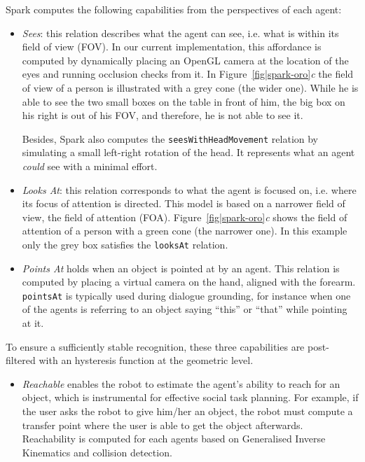 \documentclass[preprint,3p,times]{elsarticle}
\newcommand{\concept}[1]{{\small \texttt{#1}}}
\newcommand{\ie}{i.e.\xspace}
\begin{document}
{\sc Spark} computes the following capabilities from the perspectives of each agent:

\begin{itemize}

\item \emph{Sees}: this relation describes what the agent can see, \ie what is
    within its field of view (FOV). In our current implementation, this
    affordance is computed by dynamically placing an OpenGL camera at the
    location of the eyes and running occlusion checks from it.  In
    Figure~\ref{fig|spark-oro}\emph{c} the field of view of a person is
    illustrated with a grey cone (the wider one). While he is able to see the two
    small boxes on the table in front of him, the big box on his right is out of
    his FOV, and therefore, he is not able to see it. 

    Besides, {\sc Spark} also computes the \concept{seesWithHeadMovement}
    relation by simulating a small left-right rotation of the head. It
    represents what an agent \emph{could} see with a minimal effort.
    

\item \emph{Looks At}: this relation corresponds to what the agent is focused
    on, \ie where its focus of attention is directed. This model is based on a
    narrower field of view, the field of attention (FOA).
    Figure~\ref{fig|spark-oro}\emph{c} shows the field of attention
    of a person with a green cone (the narrower one). In this example only the grey
    box satisfies the \concept{looksAt} relation.


\item \emph{Points At} holds when an object is pointed at by an agent.
    This relation is computed by placing a virtual camera on the hand, aligned
    with the forearm. \concept{pointsAt} is typically used during dialogue
    grounding, for instance when one of the agents is referring to an object
    saying ``this'' or ``that'' while pointing at it.
\end{itemize}

To ensure a sufficiently stable recognition, these three capabilities are post-filtered
with an hysteresis function at the geometric level.

\begin{itemize}
\item \emph{Reachable} enables the robot to estimate the agent's ability to
    reach for an object, which is instrumental for effective social task
    planning. For example, if the user asks the robot to give him/her an object,
    the robot must compute a transfer point where the user is able to get the
    object afterwards.  Reachability is computed for each agents based on
    Generalised Inverse Kinematics and collision detection.

\end{itemize}
\end{document}
